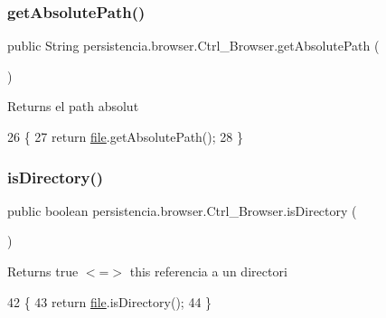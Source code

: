 \subsubsection{\texorpdfstring{get\+Absolute\+Path()}{getAbsolutePath()}}
{\footnotesize\ttfamily public String persistencia.\+browser.\+Ctrl\+\_\+\+Browser.\+get\+Absolute\+Path (\begin{DoxyParamCaption}{ }\end{DoxyParamCaption})\hspace{0.3cm}{\ttfamily [inline]}}

\begin{DoxyReturn}{Returns}
el path absolut 
\end{DoxyReturn}

\begin{DoxyCode}
26                                     \{
27         \textcolor{keywordflow}{return} \hyperlink{classpersistencia_1_1browser_1_1Ctrl__Browser_a72c151aed575c0848f7dbb1609b373c8}{file}.getAbsolutePath();
28     \}
\end{DoxyCode}
\mbox{\label{classpersistencia_1_1browser_1_1Ctrl__Browser_abdf13ea9a8d928b1efc6f3a69e18f6c6}} 
\subsubsection{\texorpdfstring{is\+Directory()}{isDirectory()}}
{\footnotesize\ttfamily public boolean persistencia.\+browser.\+Ctrl\+\_\+\+Browser.\+is\+Directory (\begin{DoxyParamCaption}{ }\end{DoxyParamCaption})\hspace{0.3cm}{\ttfamily [inline]}}

\begin{DoxyReturn}{Returns}
true $<$=$>$ this referencia a un directori 
\end{DoxyReturn}

\begin{DoxyCode}
42                                  \{
43         \textcolor{keywordflow}{return} \hyperlink{classpersistencia_1_1browser_1_1Ctrl__Browser_a72c151aed575c0848f7dbb1609b373c8}{file}.isDirectory();
44     \}
\end{DoxyCode}
\mbox{\label{classpersistencia_1_1browser_1_1Ctrl__Browser_a22b50558c4e066fe0e486def502bd30d}} 
